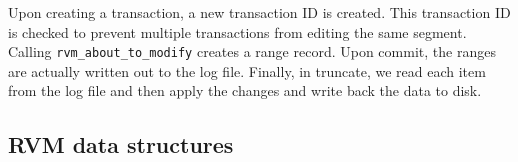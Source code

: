 \documentclass[paper=a4,fontsize=11pt]{report} %
\numberwithin{equation}{section} %
\numberwithin{figure}{section} %
\numberwithin{table}{section} %
\begin{document}
Upon creating a transaction, a new transaction ID is created. This transaction ID is checked to prevent multiple transactions from editing the same segment. Calling \texttt{rvm\_about\_to\_modify} creates a range record. Upon commit, the ranges are actually written out to the log file. Finally, in truncate, we read each item from the log file and then apply the changes and write back the data to disk.

\subsection{RVM data structures}



\end{document}
